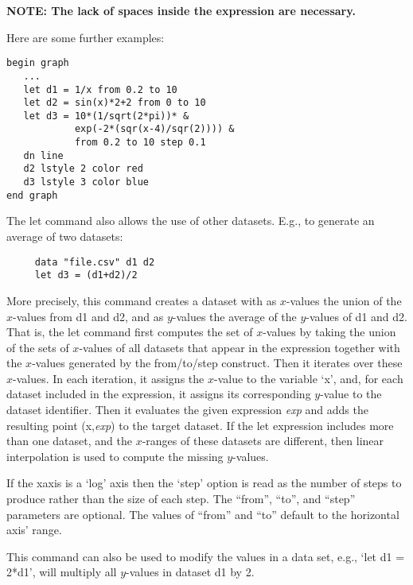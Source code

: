 \begin{commanddescription}
{\bf NOTE: The lack of spaces inside the expression are necessary.}

Here are some further examples:

\begin{minipage}[c]{8cm}
\begin{Verbatim}
begin graph
   ...
   let d1 = 1/x from 0.2 to 10
   let d2 = sin(x)*2+2 from 0 to 10
   let d3 = 10*(1/sqrt(2*pi))* &
            exp(-2*(sqr(x-4)/sqr(2)))) &
            from 0.2 to 10 step 0.1
   dn line
   d2 lstyle 2 color red
   d3 lstyle 3 color blue
end graph
\end{Verbatim}
\end{minipage}
\hfill
\begin{minipage}[c]{7cm}
\mbox{}
\end{minipage}
\vspace{0.2cm}

The let command also allows the use of other datasets. E.g., to generate an average of two datasets:

\begin{Verbatim}
     data "file.csv" d1 d2
     let d3 = (d1+d2)/2
\end{Verbatim}

More precisely, this command creates a dataset with as $x$-values the union of the $x$-values from d1 and d2, and as $y$-values the average of the $y$-values of d1 and d2. That is, the let command first computes the set of $x$-values by taking the union of the sets of $x$-values of all datasets that appear in the expression together with the $x$-values generated by the from/to/step construct. Then it iterates over these $x$-values. In each iteration, it assigns the $x$-value to the variable `x', and, for each dataset included in the expression, it assigns its corresponding $y$-value to the dataset identifier. Then it evaluates the given expression {\it exp} and adds the resulting point (x,{\it exp}) to the target dataset. If the let expression includes more than one dataset, and the $x$-ranges of these datasets are different, then linear interpolation is used to compute the missing $y$-values.

If the xaxis is a `log' axis then the `step' option is read as the number of steps to produce rather than the size of each step. The ``from'', ``to'', and ``step'' parameters are optional. The values of ``from'' and ``to'' default to the horizontal axis' range.

This command can also be used to modify the values in a data set, e.g., `let d1 = 2*d1', will multiply all $y$-values in dataset d1 by 2.


\end{commanddescription}
